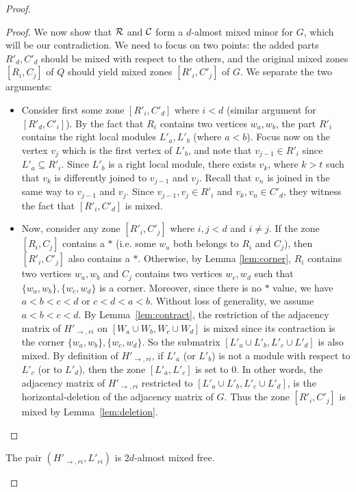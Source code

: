 \begin{proof}
\begin{proof}
We now show that ${\cal R}$ and ${\cal C}$ form a $d$-almost mixed minor for $G$, which will be our contradiction. We need to focus on two points: the added parts $R'_d,C'_d$ should be mixed with respect to the others, and the original mixed zones $[R_i,C_j]$ of $Q$ should yield mixed zones $[R'_i,C'_j]$ of $G$. We separate the two arguments:
\begin{itemize}
    \item Consider first some zone $[R'_i,C'_d]$ where $i<d$ (similar argument for $[R'_d,C'_i]$). By the fact that $R_i$ contains two vertices $w_a,w_b$, the part $R'_i$ contains the right local modules $L'_a,L'_b$ (where $a<b$). Focus now on the vertex $v_j$ which is the first vertex of $L'_b$, and note that $v_{j-1}\in R'_i$ since $L'_a\subseteq R'_i$. Since $L'_b$ is a right local module, there exists $v_k$, where $k>t$ such that $v_k$ is differently joined to $v_{j-1}$ and $v_j$. Recall that $v_n$ is joined in the same way to $v_{j-1}$ and $v_j$. Since $v_{j-1},v_j\in R'_i$ and $v_k,v_n\in C'_d$, they witness the fact that $[R'_i,C'_d]$ is mixed. 
    \item Now, consider any zone $[R'_i,C'_j]$ where $i,j<d$ and $i\neq j$. If the zone $[R_i,C_j]$ contains a $*$ (i.e. some $w_a$ both belongs to $R_i$ and $C_j$), then $[R'_i,C'_j]$ also contains a $*$. Otherwise, by Lemma \ref{lem:corner}, $R_i$ contains two vertices $w_a,w_b$ and $C_j$ contains two vertices $w_c,w_d$ such that $\{w_a,w_b\},\{w_c,w_d\}$ is a corner. Moreover, since there is no $*$ value, we have $a<b<c<d$ or $c<d<a<b$. Without loss of generality, we assume $a<b<c<d$. By Lemma~\ref{lem:contract}, the restriction of the adjacency matrix of $H'_{\rightarrow,ri}$ on $[W_a\cup W_b,W_c\cup W_d]$ is mixed since its contraction is the corner $\{w_a,w_b\},\{w_c,w_d\}$. So the submatrix $[L'_a\cup L'_b,L'_c\cup L'_d]$ is also mixed.
    By definition of $H'_{\rightarrow,ri}$, if $L'_a$ (or $L'_b$) is not a module with respect to $L'_c$ (or to $L'_d$), then the zone $[L'_a,L'_c]$ is set to 0. In other words, the adjacency matrix of $H'_{\rightarrow,ri}$ restricted to $[L'_a\cup L'_b,L'_c\cup L'_d]$, is the horizontal-deletion of the adjacency matrix of $G$. Thus the zone $[R'_i,C'_j]$ is mixed by Lemma~\ref{lem:deletion}.
\end{itemize}
\end{proof}
\begin{claim}
    The pair $(H'_{\rightarrow,ri},L'_{ri})$ is $2d$-almost mixed free.
\end{claim}


\end{proof}
